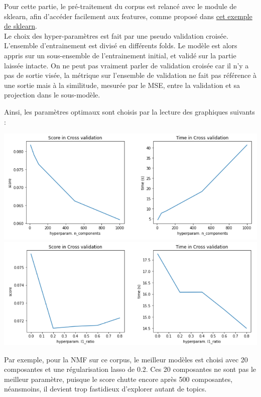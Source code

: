 \documentclass[a4paper,11pt]{article}
\begin{document}
Pour cette partie, le pré-traitement du corpus est relancé avec le module de sklearn, afin d'accéder facilement aux features, comme proposé dans {\color{blue} \href{https://scikit-learn.org/stable/auto_examples/applications/plot_topics_extraction_with_nmf_lda.html#sphx-glr-auto-examples-applications-plot-topics-extraction-with-nmf-lda-py}{cet exemple de sklearn}}. \\

Le choix des hyper-paramètres est fait par une pseudo validation croisée. L'ensemble d'entrainement est divisé en différents folds. Le modèle est alors appris sur un sous-ensemble de l'entrainement initial, et validé sur la partie laissée intacte. On ne peut pas vraiment parler de validation croisée car il n'y a pas de sortie visée, la métrique sur l'ensemble de validation ne fait pas référence à une sortie mais à la similitude, mesurée par le MSE, entre la validation et sa projection dans le sous-modèle. 

Ainsi, les paramètres optimaux sont choisis par la lecture des graphiques suivants : 

\begin{center}
    \includegraphics[width=0.8\linewidth]{illustrations/corpus_NMF_set_n_components.png}
    \includegraphics[width=0.8\linewidth]{illustrations/corpus_NMF_set_l1_ratio.png}
\end{center}

Par exemple, pour la NMF sur ce corpus, le meilleur modèles est choisi avec 20 composantes et une régularisation lasso de 0.2. Ces 20 composantes ne sont pas le meilleur paramètre, puisque le score chutte encore après 500 composantes, néansmoins, il devient trop fastidieux d'explorer autant de topics. 
\end{document}
